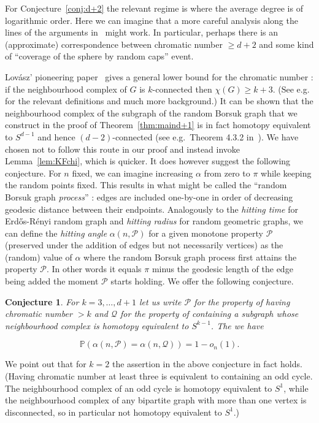 \documentclass[11pt]{article}%
\newtheorem{conjecture}[conjecture]{Conjecture}
\newcommand{\Pcal}[0]{\ensuremath{{\mathcal P}}}
\newcommand{\Qcal}[0]{\ensuremath{{\mathcal Q}}}
\newcommand{\Pee}[0]{\ensuremath{{\mathbb P}}}
\begin{document}
For Conjecture~\ref{conj:d+2} the relevant regime is where the
average degree is of logarithmic order. Here we can imagine that a more careful analysis along the lines 
of the arguments in~\cite{KahleFig} might work. In particular, perhaps there is an (approximate) correspondence 
between chromatic number $\geq d+2$ and some 
kind of ``coverage of the sphere by random caps'' event.

Lov\'asz' pioneering paper~\cite{Lovasz78} gives a general lower bound for the chromatic number : 
if the neighbourhood complex of $G$ is $k$-connected then $\chi(G) \geq k+3$.
(See e.g.~\cite{MatousekBorsukUlam} for the relevant definitions and much more background.)
It can be shown that the neighbourhood complex of the 
subgraph of the random Borsuk graph that we construct in the proof of
Theorem~\ref{thm:maind+1} is in fact homotopy equivalent to $S^{d-1}$ and hence $(d-2)$-connected
(see e.g.~Theorem 4.3.2 in~\cite{MatousekBorsukUlam}).
We have chosen not to follow this route in our proof and instead invoke Lemma~\ref{lem:KFchi}, which is quicker.
It does however suggest the following conjecture. 
For $n$ fixed, we can imagine increasing $\alpha$ from zero to $\pi$ while keeping the
random points fixed.
This results in what might be called the ``random Borsuk graph {\em process}'' : edges are included one-by-one in 
order of decreasing geodesic distance between their endpoints.
Analogously to the {\em hitting time} for Erd\H{o}s-R\'enyi random graph and {\em hitting radius} for random geometric 
graphs, we can define the {\em hitting angle} $\alpha(n,\Pcal)$ for a given monotone property $\Pcal$ (preserved under the addition of edges but not 
necessarily vertices) as the (random) value of $\alpha$ where the random Borsuk graph process first 
attains the property $\Pcal$. In other words it equals $\pi$ minus the geodesic length of the edge 
being added the moment $\Pcal$ starts holding.
We offer the following conjecture.

\begin{conjecture}
For $k=3,\dots,d+1$ let us write $\Pcal$ for the 
property of having chromatic number $>k$ and $\Qcal$ for the property of 
containing a subgraph whose neighbourhood complex is homotopy equivalent to $S^{k-1}$.
The we have 

$$ \Pee( \alpha(n,\Pcal) = \alpha(n,\Qcal) ) = 1-o_n(1). $$

\end{conjecture}


We point out that for $k=2$ the assertion in the above conjecture in fact holds.
(Having chromatic number at least three is equivalent to containing an odd cycle.
The neighbourhood complex of an odd cycle is homotopy equivalent 
to $S^1$, while the neighbourhood complex of any bipartite graph with more than one vertex is disconnected, so in particular
not homotopy equivalent to $S^1$.)
\end{document}
